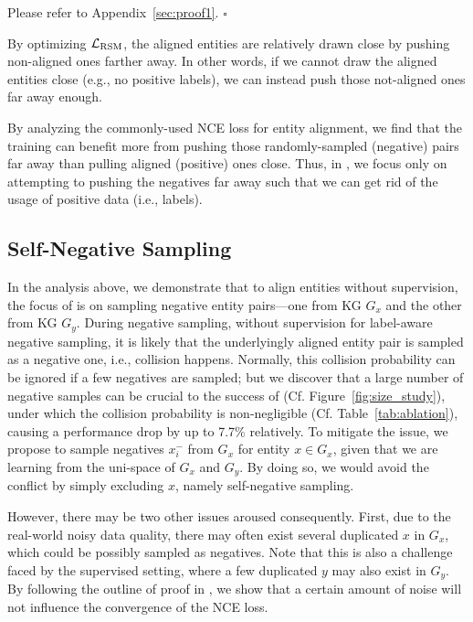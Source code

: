 \vspace{-0.2cm}

\begin{pf}
    Please refer to Appendix~\ref{sec:proof1}. \hfill$\square$
\end{pf}

By optimizing $\mathcal{L}_{\rm RSM}$, the aligned entities are relatively drawn close by pushing non-aligned ones farther away. 
In other words, if we cannot draw the aligned entities close (e.g., no positive labels), we can instead push those not-aligned ones far away enough.

By analyzing the commonly-used NCE loss for entity alignment, we find that the training can benefit more from pushing those randomly-sampled (negative) pairs far away than pulling aligned (positive) ones close. 
Thus, in \solution, we focus only on attempting to pushing the negatives far away such that we can get rid of the usage of positive data (i.e., labels).


\subsection{Self-Negative Sampling}
\label{sec:sns}

In the analysis above, we demonstrate that to align entities without supervision, the focus of \solution is on sampling negative entity pairs---one from KG $G_x$ and the other from KG $G_y$. 
During negative sampling, without supervision for label-aware negative sampling, it is likely that the underlyingly aligned entity pair is sampled as a negative one, i.e., collision happens. 
Normally, this collision probability can be ignored if a few negatives are sampled; but we discover that a large number of negative samples can be crucial to the success of \solution (Cf. Figure~\ref{fig:size_study}), under which the collision probability is non-negligible (Cf. Table~\ref{tab:ablation}), causing a performance drop by up to 7.7\% relatively.
To mitigate the issue, we propose to sample negatives $x_i^-$ from ${G_x}$ for entity $x\in G_x$, given that we are learning from the uni-space of $G_x$ and $G_y$. 
By doing so, we would avoid the conflict by simply excluding $x$, namely self-negative sampling. 

However, there may be two other issues aroused consequently. 
First, due to the real-world noisy data quality, there may often exist several duplicated $x$ in $G_x$, which could be possibly sampled as negatives. 
Note that this  is also a challenge faced by the supervised  setting, where a few duplicated $y$ may also exist in $G_y$. 
By following the outline of proof in \cite{wang2020understanding},  we show that a certain amount of noise will not influence the convergence of the NCE loss. 


